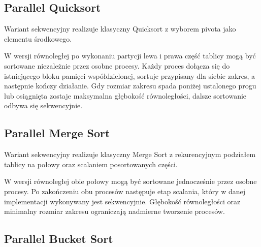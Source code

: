 \subsection{Parallel Quicksort}

Wariant sekwencyjny realizuje klasyczny Quicksort z wyborem pivota jako elementu środkowego.



W wersji równoległej po wykonaniu partycji lewa i prawa część tablicy mogą być sortowane niezależnie przez osobne procesy. 
Każdy proces dołącza się do istniejącego bloku pamięci współdzielonej, sortuje przypisany dla siebie zakres, a następnie kończy działanie. 
Gdy rozmiar zakresu spada poniżej ustalonego progu lub osiągnięta zostaje maksymalna głębokość równoległości, 
dalsze sortowanie odbywa się sekwencyjnie.



\subsection{Parallel Merge Sort}

Wariant sekwencyjny realizuje klasyczny Merge Sort z rekurencyjnym podziałem tablicy na połowy oraz scalaniem posortowanych części.



W wersji równoległej obie połowy mogą być sortowane jednocześnie przez osobne procesy. 
Po zakończeniu obu procesów następuje etap scalania, który w danej implementacji wykonywany jest sekwencyjnie. 
Głębokość równoległości oraz minimalny rozmiar zakresu ograniczają nadmierne tworzenie procesów.



\subsection{Parallel Bucket Sort}

